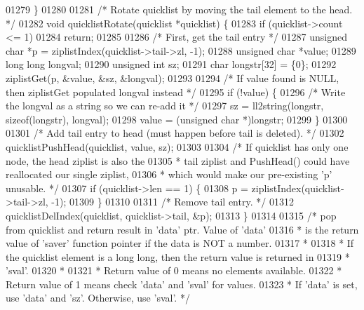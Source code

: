 \begin{DoxyCode}
{{{{{{{{{{01279 \}
01280 
01281 \textcolor{comment}{/* Rotate quicklist by moving the tail element to the head. */}
01282 \textcolor{keywordtype}{void} quicklistRotate(quicklist *quicklist) \{
01283     \textcolor{keywordflow}{if} (quicklist->count <= 1)
01284         \textcolor{keywordflow}{return};
01285 
01286     \textcolor{comment}{/* First, get the tail entry */}
01287     \textcolor{keywordtype}{unsigned} \textcolor{keywordtype}{char} *p = ziplistIndex(quicklist->tail->zl, -1);
01288     \textcolor{keywordtype}{unsigned} \textcolor{keywordtype}{char} *value;
01289     \textcolor{keywordtype}{long} \textcolor{keywordtype}{long} longval;
01290     \textcolor{keywordtype}{unsigned} \textcolor{keywordtype}{int} sz;
01291     \textcolor{keywordtype}{char} longstr[32] = \{0\};
01292     ziplistGet(p, &value, &sz, &longval);
01293 
01294     \textcolor{comment}{/* If value found is NULL, then ziplistGet populated longval instead */}
01295     \textcolor{keywordflow}{if} (!value) \{
01296         \textcolor{comment}{/* Write the longval as a string so we can re-add it */}
01297         sz = ll2string(longstr, \textcolor{keyword}{sizeof}(longstr), longval);
01298         value = (\textcolor{keywordtype}{unsigned} \textcolor{keywordtype}{char} *)longstr;
01299     \}
01300 
01301     \textcolor{comment}{/* Add tail entry to head (must happen before tail is deleted). */}
01302     quicklistPushHead(quicklist, value, sz);
01303 
01304     \textcolor{comment}{/* If quicklist has only one node, the head ziplist is also the}
01305 \textcolor{comment}{     * tail ziplist and PushHead() could have reallocated our single ziplist,}
01306 \textcolor{comment}{     * which would make our pre-existing 'p' unusable. */}
01307     \textcolor{keywordflow}{if} (quicklist->len == 1) \{
01308         p = ziplistIndex(quicklist->tail->zl, -1);
01309     \}
01310 
01311     \textcolor{comment}{/* Remove tail entry. */}
01312     quicklistDelIndex(quicklist, quicklist->tail, &p);
01313 \}
01314 
01315 \textcolor{comment}{/* pop from quicklist and return result in 'data' ptr.  Value of 'data'}
01316 \textcolor{comment}{ * is the return value of 'saver' function pointer if the data is NOT a number.}
01317 \textcolor{comment}{ *}
01318 \textcolor{comment}{ * If the quicklist element is a long long, then the return value is returned in}
01319 \textcolor{comment}{ * 'sval'.}
01320 \textcolor{comment}{ *}
01321 \textcolor{comment}{ * Return value of 0 means no elements available.}
01322 \textcolor{comment}{ * Return value of 1 means check 'data' and 'sval' for values.}
01323 \textcolor{comment}{ * If 'data' is set, use 'data' and 'sz'.  Otherwise, use 'sval'. */}
}}}}}}}}}}
\end{DoxyCode}
